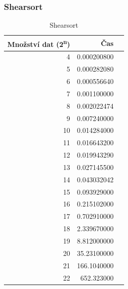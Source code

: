 \documentclass[12pt]{article}
\begin{document}
\subsubsection{Shearsort}
\begin{table}[H]
\begin{center}
\begin{tabular}{|r|r|r|}
\hline Množství dat (2\textsuperscript{n}) & Čas \\ \hline

4       &  0.000200800 \\ \hline
5       &  0.000282080 \\ \hline
6       &  0.000556640 \\ \hline
7       &  0.001100000 \\ \hline
8       &  0.002022474 \\ \hline
9       &  0.007240000\\ \hline
10      &  0.014284000 \\ \hline
11      &  0.016643200 \\ \hline
12      &  0.019943290 \\ \hline
13      &  0.027145500 \\ \hline
14      &  0.043032042 \\ \hline
15      &  0.093929000 \\ \hline
16      &  0.215102000 \\ \hline
17      &  0.702910000 \\ \hline
18      &  2.339670000 \\ \hline
19      &  8.812000000 \\ \hline
20      &  35.23100000 \\ \hline
21      &  166.1040000 \\ \hline
22	&  652.323000  \\ \hline

\end{tabular} 
\end{center}
\caption{Shearsort}
\end{table} 
\end{document}
